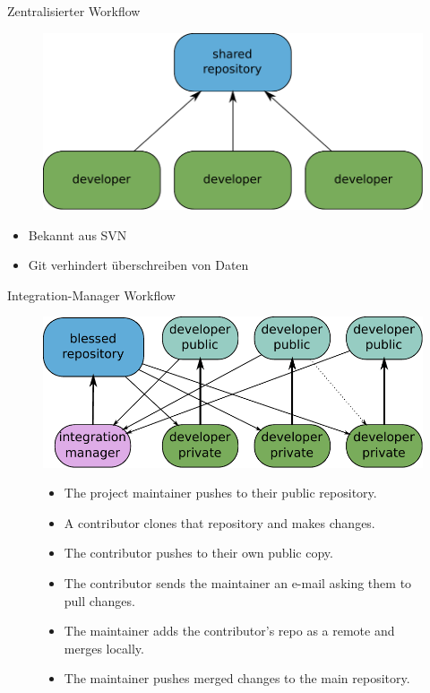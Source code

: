 \begin{frame}{Zentralisierter Workflow}
\begin{figure} 
\centering
\includegraphics[scale=0.6]{images/centralized-workflow.pdf}
\end{figure}
\begin{itemize}
\pause \item Bekannt aus SVN
\pause \item Git verhindert überschreiben von Daten
\end{itemize}
\end{frame}

\begin{frame}{Integration-Manager Workflow}
\begin{figure} 
\centering
\includegraphics[scale=0.6]{images/integration-manager-workflow.pdf}
\begin{itemize}
\pause \item The project maintainer pushes to their public repository.
\pause \item A contributor clones that repository and makes changes.
\pause \item The contributor pushes to their own public copy.
\pause \item The contributor sends the maintainer an e-mail asking them to pull changes.
\pause \item The maintainer adds the contributor’s repo as a remote and merges locally.
\pause \item The maintainer pushes merged changes to the main repository.
\end{itemize}
\end{figure}
\end{frame}

